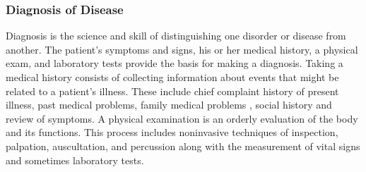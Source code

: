 \documentclass[12pt]{article}
\begin{document}
\subsubsection{Diagnosis of Disease}
\hspace{1cm}
Diagnosis  is the science and skill of distinguishing one disorder or disease from another. The patient's symptoms and signs, his or her medical history, a physical exam, and laboratory tests provide the basis for making a diagnosis. Taking a medical history consists of collecting information about events that might be related to a patient's illness. These include chief complaint history of present illness, past medical problems, family medical problems , social history and review of symptoms. A physical examination is an orderly evaluation of the body and its functions. This process includes noninvasive techniques of inspection, palpation, auscultation, and percussion along with the measurement of vital signs and sometimes laboratory tests. 

 
\end{document}
